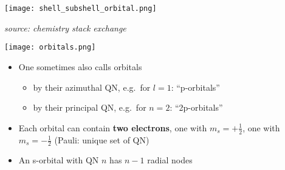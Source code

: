
\begin{center}
    \texttt{[image: shell\_subshell\_orbital.png]}
\end{center}
\textit{source: chemistry stack exchange}
\begin{center}
    \texttt{[image: orbitals.png]}
\end{center}


\begin{itemize}
    \item One sometimes also calls orbitals
          \begin{itemize}
              \item by their azimuthal QN, e.g.\ for $l=1$: ``p-orbitals''
              \item by their principal QN, e.g.\ for $n=2$: ``2p-orbitals''
          \end{itemize}
    \item Each orbital can contain \textbf{two electrons}, one with $m_s=+\frac{1}{2}$, one with $m_s=-\frac{1}{2}$ (Pauli: unique set of QN)
    \item An s-orbital with QN $n$ has $n-1$ radial nodes
\end{itemize}

